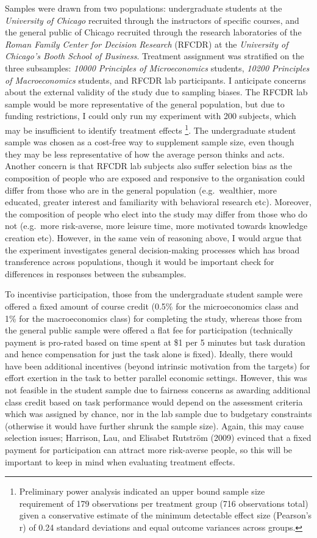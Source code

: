 \documentclass[
  12,
  letterpaper,
  DIV=11,
  numbers=noendperiod]{scrartcl}
\begin{document}
Samples were drawn from two populations: undergraduate students at the
\emph{University of Chicago} recruited through the instructors of
specific courses, and the general public of Chicago recruited through
the research laboratories of the \emph{Roman Family Center for Decision
Research} (RFCDR) at the \emph{University of Chicago's Booth School of
Business}. Treatment assignment was stratified on the three subsamples:
\emph{10000 Principles of Microeconomics} students, \emph{10200
Principles of Macroeconomics} students, and RFCDR lab participants. I
anticipate concerns about the external validity of the study due to
sampling biases. The RFCDR lab sample would be more representative of
the general population, but due to funding restrictions, I could only
run my experiment with 200 subjects, which may be insufficient to
identify treatment effects \footnote{Preliminary power analysis
  indicated an upper bound sample size requirement of 179 observations
  per treatment group (716 observations total) given a conservative
  estimate of the minimum detectable effect size (Pearson's r) of 0.24
  standard deviations and equal outcome variances across groups.}. The
undergraduate student sample was chosen as a cost-free way to supplement
sample size, even though they may be less representative of how the
average person thinks and acts. Another concern is that RFCDR lab
subjects also suffer selection bias as the composition of people who are
exposed and responsive to the organisation could differ from those who
are in the general population (e.g.~wealthier, more educated, greater
interest and familiarity with behavioral research etc). Moreover, the
composition of people who elect into the study may differ from those who
do not (e.g.~more risk-averse, more leisure time, more motivated towards
knowledge creation etc). However, in the same vein of reasoning above, I
would argue that the experiment investigates general decision-making
processes which has broad transference across populations, though it
would be important check for differences in responses between the
subsamples.

To incentivise participation, those from the undergraduate student
sample were offered a fixed amount of course credit (0.5\% for the
microeconomics class and 1\% for the macroeconomics class) for
completing the study, whereas those from the general public sample were
offered a flat fee for participation (technically payment is pro-rated
based on time spent at \$1 per 5 minutes but task duration and hence
compensation for just the task alone is fixed). Ideally, there would
have been additional incentives (beyond intrinsic motivation from the
targets) for effort exertion in the task to better parallel economic
settings. However, this was not feasible in the student sample due to
fairness concerns as awarding additional class credit based on task
performance would depend on the assessment criteria which was assigned
by chance, nor in the lab sample due to budgetary constraints (otherwise
it would have further shrunk the sample size). Again, this may cause
selection issues; Harrison, Lau, and Elisabet Rutström (2009) evinced
that a fixed payment for participation can attract more risk-averse
people, so this will be important to keep in mind when evaluating
treatment effects.
\end{document}
